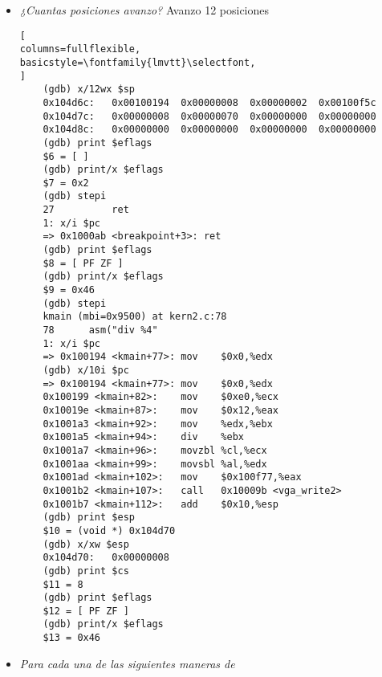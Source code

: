 \documentclass[a4paper, 12pt]{article}
\begin{document}
\begin{itemize}
\begin{lstlisting}[
columns=fullflexible,
basicstyle=\fontfamily{lmvtt}\selectfont,
]
	Breakpoint 1, idt_init () at interrupts.c:27
	27	    idt_install(T_BRKPT, breakpoint);
	1: x/i $pc
	=> 0x100586 <idt_init+3>:	push   $0x1000a8
	(gdb) finish
	Correr hasta la salida desde #0  idt_init () at interrupts.c:27
	kmain (mbi=0x9500) at kern2.c:73
	73	    asm("int3");  // (b)
	1: x/i $pc
	=> 0x100193 <kmain+76>:	int3
	(gdb) x/10i $pc
	=> 0x100193 <kmain+76>:	int3
	0x100194 <kmain+77>:	mov    $0x0,%edx
	0x100199 <kmain+82>:	mov    $0xe0,%ecx
	0x10019e <kmain+87>:	mov    $0x12,%eax
	0x1001a3 <kmain+92>:	mov    %edx,%ebx
	0x1001a5 <kmain+94>:	div    %ebx
	0x1001a7 <kmain+96>:	movzbl %cl,%ecx
	0x1001aa <kmain+99>:	movsbl %al,%edx
	0x1001ad <kmain+102>:	mov    $0x100f77,%eax
	0x1001b2 <kmain+107>:	call   0x10009b <vga_write2>
	(gdb) print $esp
	$1 = (void *) 0x104d78
	(gdb) x/xw $esp
	0x104d78:	0x00100f5c
	(gdb) print $cs
	$2 = 8
	(gdb) print $eflags
	$3 = [ ]
	(gdb) print/x $eflags
	$4 = 0x2
	(gdb) stepi
	breakpoint () at idt_entry.S:26
	26	        test %eax, %eax
	1: x/i $pc
	=> 0x1000a9 <breakpoint+1>:	test   %eax,%eax
	(gdb) print $esp
	$5 = (void *) 0x104d6c
\end{lstlisting}
				\item \textit{¿Cuantas posiciones avanzo?}
				Avanzo 12 posiciones
\begin{lstlisting}[
columns=fullflexible,
basicstyle=\fontfamily{lmvtt}\selectfont,
]
	(gdb) x/12wx $sp
	0x104d6c:	0x00100194	0x00000008	0x00000002	0x00100f5c
	0x104d7c:	0x00000008	0x00000070	0x00000000	0x00000000
	0x104d8c:	0x00000000	0x00000000	0x00000000	0x00000000
	(gdb) print $eflags
	$6 = [ ]
	(gdb) print/x $eflags
	$7 = 0x2
	(gdb) stepi
	27	        ret
	1: x/i $pc
	=> 0x1000ab <breakpoint+3>:	ret
	(gdb) print $eflags
	$8 = [ PF ZF ]
	(gdb) print/x $eflags
	$9 = 0x46
	(gdb) stepi
	kmain (mbi=0x9500) at kern2.c:78
	78	    asm("div %4"
	1: x/i $pc
	=> 0x100194 <kmain+77>:	mov    $0x0,%edx
	(gdb) x/10i $pc
	=> 0x100194 <kmain+77>:	mov    $0x0,%edx
	0x100199 <kmain+82>:	mov    $0xe0,%ecx
	0x10019e <kmain+87>:	mov    $0x12,%eax
	0x1001a3 <kmain+92>:	mov    %edx,%ebx
	0x1001a5 <kmain+94>:	div    %ebx
	0x1001a7 <kmain+96>:	movzbl %cl,%ecx
	0x1001aa <kmain+99>:	movsbl %al,%edx
	0x1001ad <kmain+102>:	mov    $0x100f77,%eax
	0x1001b2 <kmain+107>:	call   0x10009b <vga_write2>
	0x1001b7 <kmain+112>:	add    $0x10,%esp
	(gdb) print $esp
	$10 = (void *) 0x104d70
	(gdb) x/xw $esp
	0x104d70:	0x00000008
	(gdb) print $cs
	$11 = 8
	(gdb) print $eflags
	$12 = [ PF ZF ]
	(gdb) print/x $eflags
	$13 = 0x46
\end{lstlisting}
\item \textit{Para cada una de las siguientes maneras de
}
\end{itemize}
\end{document}
